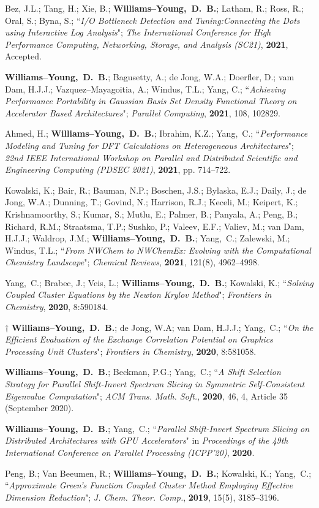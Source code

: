 \documentclass[10pt]{res} %
\newcommand*\me[0]{{\bf Williams--Young,~D.~B.}}
\newcommand*\cy[0]{Yang,~C.}
\begin{document}
\begin{resume}
\begin{etaremune}
  \item Bez, J.L.; Tang, H.; Xie, B.; \me; Latham, R.; Ross, R.; Oral, S.; Byna, S.;
        ``\emph{I/O Bottleneck Detection and Tuning:Connecting the Dots using Interactive Log Analysis}";
        \emph{The International Conference for High Performance Computing, Networking, Storage, and Analysis (SC21)}, 
        \textbf{2021}, Accepted.
  \item \me; Bagusetty, A.; de Jong, W.A.; Doerfler, D.; vam Dam, H.J.J.; Vazquez--Mayagoitia, A.;
        Windus, T.L.; Yang, C.;
        ``\emph{Achieving Performance Portability in Gaussian Basis Set Density Functional Theory 
                on Accelerator Based Architectures}"; \emph{Parallel Computing},
        \textbf{2021}, 108, 102829.
  \item Ahmed, H.; \me; Ibrahim, K.Z.; \cy;
        ``\emph{Performance Modeling and Tuning for DFT Calculations on Heterogeneous Architectures}";
        \emph{22nd IEEE International Workshop on Parallel and Distributed Scientific and Engineering Computing (PDSEC 2021)},
        \textbf{2021}, pp. 714--722.
  \item Kowalski, K.; Bair, R.; Bauman, N.P.; Boschen, J.S.; Bylaska, E.J.; Daily, J.; de Jong, W.A.; 
        Dunning, T.; Govind, N.; Harrison, R.J.; Keceli, M.; Keipert, K.; Krishnamoorthy, S.; Kumar, S.;
        Mutlu, E.; Palmer, B.; Panyala, A.; Peng, B.; Richard, R.M.; Straatsma, T.P.; Sushko, P.; Valeev, E.F.;
        Valiev, M.; van Dam, H.J.J.; Waldrop, J.M.; \me; \cy; Zalewski, M.; Windus, T.L.;
       ``\emph{From NWChem to NWChemEx: Evolving with the Computational Chemistry Landscape}"; \emph{Chemical Reviews},
       \textbf{2021}, 121(8), 4962--4998.
  \item \cy; Brabec, J.; Veis, L.; \me; Kowalski, K.;
        ``\emph{Solving Coupled Cluster Equations by the Newton Krylov Method}";
        \emph{Frontiers in Chemistry}, \textbf{2020}, 8:590184.
  \item $\dagger$ \me; de Jong, W.A; van Dam, H.J.J.; \cy;
        ``\emph{On the Efficient Evaluation of the Exchange Correlation Potential on Graphics Processing Unit Clusters}";
        \emph{Frontiers in Chemistry}, \textbf{2020}, 8:581058.
  \item \me; Beckman, P.G.; \cy;
        ``\emph{A Shift Selection Strategy for Parallel Shift-Invert Spectrum Slicing in Symmetric Self-Consistent 
        Eigenvalue Computation}";
        \emph{ACM Trans. Math. Soft.}, \textbf{2020}, 46, 4, Article 35 (September 2020).
  \item \me; \cy;
        ``\emph{Parallel Shift-Invert Spectrum Slicing on Distributed Architectures with GPU Accelerators}"
        in \emph{Proceedings of the 49th International Conference on Parallel Processing (ICPP'20)}, \textbf{2020}.
  \item Peng, B.; Van Beeumen, R.; \me; Kowalski, K.; \cy;
        ``\emph{Approximate Green’s Function Coupled Cluster Method Employing 
          Effective Dimension Reduction}";
        \emph{J. Chem. Theor. Comp.}, \textbf{2019}, 15(5), 3185--3196.
\end{etaremune}


\end{resume}
\end{document}
